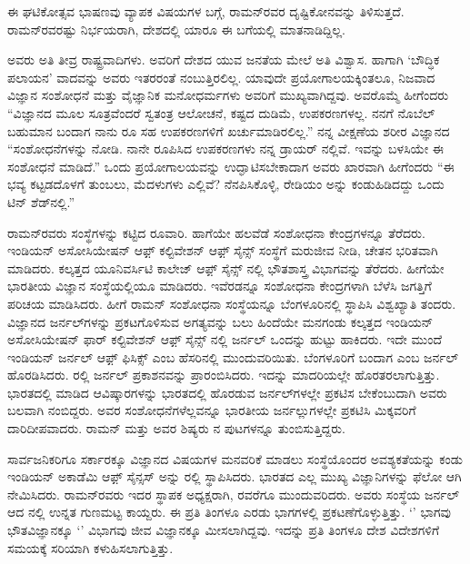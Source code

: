 ಈ ಘಟಿಕೋತ್ಸವ ಭಾಷಣವು ವ್ಯಾಪಕ ವಿಷಯಗಳ ಬಗ್ಗೆ, ರಾಮನ್‍ರವರ ದೃಷ್ಟಿಕೋನವನ್ನು ತಿಳಿಸುತ್ತದೆ. ರಾಮನ್‍ರವರಷ್ಟು ನಿರ್ಭಯರಾಗಿ, ದೇಶದಲ್ಲಿ ಯಾರೂ ಈ ಬಗೆಯಲ್ಲಿ ಮಾತನಾಡಿದ್ದಿಲ್ಲ.

ಅವರು ಅತಿ ತೀವ್ರ ರಾಷ್ಟ್ರವಾದಿಗಳು. ಅವರಿಗೆ ದೇಶದ ಯುವ ಜನತೆಯ ಮೇಲೆ ಅತಿ ವಿಶ್ವಾಸ. ಹಾಗಾಗಿ ‘ಬೌದ್ಧಿಕ ಪಲಾಯನ’ ವಾದವನ್ನು ಅವರು ಇತರರಂತೆ ನಂಬುತ್ತಿರಲಿಲ್ಲ. ಯಾವುದೇ ಪ್ರಯೋಗಾಲಯಕ್ಕಿಂತಲೂ, ನಿಜವಾದ ವಿಜ್ಞಾನ ಸಂಶೋಧನೆ ಮತ್ತು ವೈಜ್ಞಾನಿಕ ಮನೋಧರ್ಮಗಳು ಅವರಿಗೆ ಮುಖ್ಯವಾಗಿದ್ದವು. ಅವರೊಮ್ಮೆ ಹೀಗೆಂದರು\enginline{--} “ವಿಜ್ಞಾನದ ಮೂಲ ಸೂತ್ರವೆಂದರೆ ಸ್ವತಂತ್ರ ಆಲೋಚನೆ, ಕಷ್ಟದ ದುಡಿಮೆ, ಉಪಕರಣಗಳಲ್ಲ. ನನಗೆ ನೊಬೆಲ್ ಬಹುಮಾನ ಬಂದಾಗ ನಾನು  ರೂ ಸಹ ಉಪಕರಣಗಳಿಗೆ ಖರ್ಚುಮಾಡಿರಲಿಲ್ಲ.” ನನ್ನ ವೀಕ್ಷಣೆಯ ಶರೀರ ವಿಜ್ಞಾನದ “ಸಂಶೋಧನೆಗಳನ್ನು ನೋಡಿ. ನಾನೇ ರೂಪಿಸಿದ ಉಪಕರಣಗಳು ನನ್ನ ಡ್ರಾಯರ್ ನಲ್ಲಿವೆ. ಇವನ್ನು ಬಳಸಿಯೇ ಈ ಸಂಶೋಧನೆ ಮಾಡಿದೆ.” ಒಂದು ಪ್ರಯೋಗಾಲಯವನ್ನು ಉದ್ಘಾಟಿಸಬೇಕಾದಾಗ ಅವರು ಖಾರವಾಗಿ ಹೀಗೆಂದರು \enginline{--} “ಈ ಭವ್ಯ ಕಟ್ಟಡದೊಳಗೆ ತುಂಬಲು, ಮೆದಳುಗಳು ಎಲ್ಲಿವೆ? ನೆನಪಿಸಿಕೊಳ್ಳಿ, ರೇಡಿಯಂ ಅನ್ನು ಕಂಡುಹಿಡಿದದ್ದು ಒಂದು ಟಿನ್ ಶೆಡ್‍ನಲ್ಲಿ.”



ರಾಮನ್‍ರವರು ಸಂಸ್ಥೆಗಳನ್ನು ಕಟ್ಟಿದ ರೂವಾರಿ. ಹಾಗೆಯೇ ಹಲವೆಡೆ ಸಂಶೋಧನಾ ಕೇಂದ್ರಗಳನ್ನೂ ತೆರೆದರು. ಇಂಡಿಯನ್ ಅಸೋಸಿಯೇಷನ್ ಆಫ಼್ ಕಲ್ಟಿವೇಶನ್ ಆಫ಼್ ಸೈನ್ಸ್ ಸಂಸ್ಥೆಗೆ ಮರುಜೀವ ನೀಡಿ, ಚೇತನ ಭರಿತವಾಗಿ ಮಾಡಿದರು. ಕಲ್ಕತ್ತದ ಯೂನಿವರ್ಸಿಟಿ ಕಾಲೇಜ್ ಆಫ಼್ ಸೈನ್ಸ್ ನಲ್ಲಿ ಭೌತಶಾಸ್ತ್ರ ವಿಭಾಗವನ್ನು ತೆರೆದರು. ಹೀಗೆಯೇ ಭಾರತೀಯ ವಿಜ್ಞಾನ ಸಂಸ್ಥೆಯಲ್ಲಿಯೂ ಮಾಡಿದರು. ಇವೆರಡನ್ನೂ ಸಂಶೋಧನಾ ಕೇಂದ್ರಗಳಾಗಿ ಬೆಳೆಸಿ ಜಗತ್ತಿಗೆ ಪರಿಚಯ ಮಾಡಿಸಿದರು. ಹೀಗೆ ರಾಮನ್ ಸಂಶೋಧನಾ ಸಂಸ್ಥೆಯನ್ನೂ ಬೆಂಗಳೂರಿನಲ್ಲಿ ಸ್ಥಾಪಿಸಿ ವಿಶ್ವಖ್ಯಾತಿ ತಂದರು. ವಿಜ್ಞಾನದ ಜರ್ನಲ್‍ಗಳನ್ನು ಪ್ರಕಟಗೊಳಿಸುವ ಅಗತ್ಯವನ್ನು ಬಲು ಹಿಂದೆಯೇ ಮನಗಂಡು ಕಲ್ಕತ್ತದ ಇಂಡಿಯನ್ ಅಸೋಸಿಯೇಷನ್ ಫಾರ್ ಕಲ್ಟಿವೇಶನ್ ಆಫ಼್ ಸೈನ್ಸ್ ‍ನಲ್ಲಿ ಜರ್ನಲ್ ಒಂದನ್ನು ಹುಟ್ಟು ಹಾಕಿದರು. ಇದೇ ಮುಂದೆ ಇಂಡಿಯನ್ ಜರ್ನಲ್ ಆಫ಼್ ಫಿಸಿಕ್ಸ್ ಎಂಬ ಹೆಸರಿನಲ್ಲಿ ಮುಂದುವರಿಯಿತು. ಬೆಂಗಳೂರಿಗೆ ಬಂದಾಗ \textit{} ಎಂಬ ಜರ್ನಲ್ ಹೊರಡಿಸಿದರು. ರಲ್ಲಿ \textit{} ಜರ್ನಲ್ ಪ್ರಕಾಶನವನ್ನು ಪ್ರಾರಂಬಿಸಿದರು. ಇದನ್ನು \textit{} ಮಾದರಿಯಲ್ಲೇ ಹೊರತರಲಾಗುತ್ತಿತ್ತು. ಭಾರತದಲ್ಲಿ ಮಾಡಿದ ಆವಿಷ್ಕಾರಗಳನ್ನು ಭಾರತದಲ್ಲಿ ಹೊರಡುವ ಜರ್ನಲ್‍ಗಳಲ್ಲೇ ಪ್ರಕಟಿಸ ಬೇಕೆಂಬುದಾಗಿ ಅವರು ಬಲವಾಗಿ ನಂಬಿದ್ದರು. ಅವರ ಸಂಶೋಧನೆಗಳೆಲ್ಲವನ್ನೂ ಭಾರತೀಯ ಜರ್ನಲ್ಲುಗಳಲ್ಲೇ ಪ್ರಕಟಿಸಿ ಮಿಕ್ಕವರಿಗೆ ದಾರಿದೀಪವಾದರು. ರಾಮನ್ ಮತ್ತು ಅವರ ಶಿಷ್ಯರು \textit{} ನ ಪುಟಗಳನ್ನೂ ತುಂಬಿಸುತ್ತಿದ್ದರು.

ಸಾರ್ವಜನಿಕರಿಗೂ ಸರ್ಕಾರಕ್ಕೂ ವಿಜ್ಞಾನದ ವಿಷಯಗಳ ಮನವರಿಕೆ ಮಾಡಲು ಸಂಸ್ಥೆಯೊಂದರ ಅವಶ್ಯಕತೆಯನ್ನು ಕಂಡು ಇಂಡಿಯನ್ ಅಕಾಡೆಮಿ ಆಫ಼್ ಸೈನ್ಸಸ್ ಅನ್ನು ರಲ್ಲಿ ಸ್ಥಾಪಿಸಿದರು. ಭಾರತದ ಎಲ್ಲ ಮುಖ್ಯ ವಿಜ್ಞಾನಿಗಳನ್ನು ಫೆಲೋ ಆಗಿ ನೇಮಿಸಿದರು. ರಾಮನ್‍ರವರು ಇದರ ಸ್ಥಾಪಕ ಅಧ್ಯಕ್ಷರಾಗಿ,  ರವರೆಗೂ ಮುಂದುವರಿದರು. ಅವರು ಸಂಸ್ಥೆಯ ಜರ್ನಲ್ ಆದ  ನಲ್ಲಿ ಉನ್ನತ ಗುಣಮಟ್ಟ ಕಾಯ್ದರು. ಈ  ಪ್ರತಿ ತಿಂಗಳೂ ಎರಡು ಭಾಗಗಳಲ್ಲಿ ಪ್ರಕಟಣೆಗೊಳ್ಳುತ್ತಿತ್ತು. ‘’ ಭಾಗವು ಭೌತವಿಜ್ಞಾನಕ್ಕೂ ‘’ ವಿಭಾಗವು ಜೀವ ವಿಜ್ಞಾನಕ್ಕೂ ಮೀಸಲಾಗಿದ್ದವು. ಇದನ್ನು ಪ್ರತಿ ತಿಂಗಳೂ ದೇಶ ವಿದೇಶಗಳಿಗೆ ಸಮಯಕ್ಕೆ ಸರಿಯಾಗಿ ಕಳುಹಿಸಲಾಗುತ್ತಿತ್ತು.

